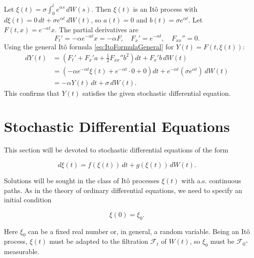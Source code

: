 \begin{Solution}
Let $\xi(t) = \sigma \int_0^t e^{\alpha s} \, dW(s)$. Then $\xi(t)$ is an Itô process with $d\xi(t) = 0 \, dt + \sigma e^{\alpha t} \, dW(t)$, so $a(t) = 0$ and $b(t) = \sigma e^{\alpha t}$.
Let $F(t, x) = e^{-\alpha t} x$. The partial derivatives are
\begin{equation*}
F_t' = -\alpha e^{-\alpha t} x = -\alpha F, \quad F_x' = e^{-\alpha t}, \quad F_{xx}'' = 0.
\end{equation*}
Using the general Itô formula \eqref{eq:ItoFormulaGeneral} for $Y(t) = F(t, \xi(t))$:
\begin{align*}
dY(t) &= \left( F_t' + F_x' a + \frac{1}{2} F_{xx}'' b^2 \right) dt + F_x' b \, dW(t) \\
&= \left( -\alpha e^{-\alpha t} \xi(t) + e^{-\alpha t} \cdot 0 + 0 \right) dt + e^{-\alpha t} (\sigma e^{\alpha t}) \, dW(t) \\
&= -\alpha Y(t) \, dt + \sigma \, dW(t).
\end{align*}
This confirms that $Y(t)$ satisfies the given stochastic differential equation.
\end{Solution}

\section{Stochastic Differential Equations}
\label{sec:StochasticDifferentialEquations}

This section will be devoted to stochastic differential equations of the form

\begin{equation}
d\xi(t) = f(\xi(t)) \, dt + g(\xi(t)) \, dW(t).
\label{eq:SDE_general}
\end{equation}

Solutions will be sought in the class of Itô processes $\xi(t)$ with a.s. continuous paths. As in the theory of ordinary differential equations, we need to specify an initial condition

\begin{equation}
\xi(0) = \xi_0.
\end{equation}

Here $\xi_0$ can be a fixed real number or, in general, a random variable. Being an Itô process, $\xi(t)$ must be adapted to the filtration $\mathcal{F}_t$ of $W(t)$, so $\xi_0$ must be $\mathcal{F}_0$-measurable.

